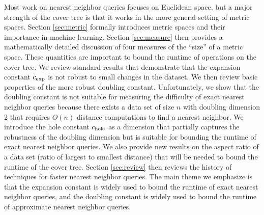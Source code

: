 \documentclass[thesis.tex]{subfiles}
\newcommand{\cexp}{c_\textnormal{exp}}
\newcommand{\chole}{c_\textnormal{hole}}
\begin{document}
Most work on nearest neighbor queries focuses on Euclidean space,
but a major strength of the cover tree is that it works in the more general setting of metric spaces.
Section \ref{sec:metric} formally introduces metric spaces and
their importance in machine learning.
Section \ref{sec:measure} then provides a mathematically detailed discussion of four measures of the ``size'' of a metric space.
These quantities are important to bound the runtime of operations on the cover tree.
We review standard results that demonstrate that the expansion constant $\cexp$ is not robust to small changes in the dataset.
We then review basic properties of the more robust doubling constant.
Unfortunately, we show that the doubling constant is not suitable for measuring the difficulty of exact nearest neighbor queries because there exists a data set of size $n$ with doubling dimension 2 that requires $O(n)$ distance computations to find a nearest neighbor.
We introduce the hole constant $\chole$ as a dimension that partially captures the robustness of the doubling dimension but is suitable for bounding the runtime of exact nearest neighbor queries.
We also provide new results on the aspect ratio of a data set 
(ratio of largest to smallest distance)
that will be needed to bound the runtime of the cover tree.
Section \ref{sec:review} then reviews the history of techniques for faster nearest neighbor queries.
The main theme we emphasize is that the expansion constant is widely used to bound the runtime of exact nearest neighbor queries,
and the doubling constant is widely used to bound the runtime of approximate nearest neighbor queries.
\end{document}
